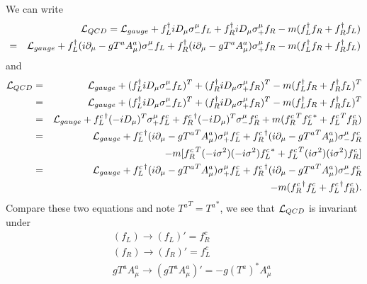 \documentclass[11pt]{article}
\def\del{{\partial}}
\begin{document}
\section{ }
We can write 
\begin{eqnarray}
    &&{\cal L}_{QCD}
    = {\cal L}_{gauge} + f_L^\dagger iD_\mu \sigma_-^\mu f_L
                + f_R^\dagger iD_\mu \sigma_+^\mu f_R
                - m ( f_L^\dagger f_R + f_R^\dagger f_L ) \nonumber \\
    &=& {\cal L}_{gauge} + f_L^\dagger (i\del_\mu-g T^a A_\mu^a) \sigma_-^\mu f_L + f_R^\dagger (i\del_\mu-g T^a A_\mu^a) \sigma_+^\mu f_R
    - m ( f_L^\dagger f_R + f_R^\dagger f_L )
\end{eqnarray}
and
\begin{eqnarray}
    {\cal L}_{QCD}
    &=& {\cal L}_{gauge} + ( f_L^\dagger iD_\mu \sigma_-^\mu f_L )^T
    + ( f_R^\dagger iD_\mu \sigma_+^\mu f_R )^T
    - m ( f_L^\dagger f_R + f_R^\dagger f_L )^T \nonumber \\
    &=& {\cal L}_{gauge} + ( f_L^\dagger iD_\mu \sigma_-^\mu f_L )^T
                + ( f_R^\dagger iD_\mu \sigma_+^\mu f_R )^T
                - m ( f_L^\dagger f_R + f_R^\dagger f_L )^T \nonumber \\
    &=& {\cal L}_{gauge} + {f_L^c}^\dagger (-iD_\mu)^T \sigma_+^\mu f_L^c
                + {f_R^c}^\dagger (-iD_\mu)^T \sigma_-^\mu f_R^c
                + m ( {f_R^c}^T {f_L^c}^*  + {f_L^c}^T {f_R^c} ) \nonumber \\
    &=& {\cal L}_{gauge} + {f_L^c}^\dagger (i\del_\mu-g {T^a}^T A_\mu^a) \sigma_+^\mu f_L^c
    + {f_R^c}^\dagger (i\del_\mu-g {T^a}^T A_\mu^a) \sigma_-^\mu f_R^c \nonumber \\
    &&- m [ {f_R^c}^T (-i\sigma^2) (-i\sigma^2) {f_L^c}^*  + {f_L^c}^T (i\sigma^2) (i\sigma^2) {f_R^c} ] \nonumber \\
    &=& {\cal L}_{gauge} + {f_L^c}^\dagger (i\del_\mu-g {T^a}^T A_\mu^a) \sigma_+^\mu f_L^c
    + {f_R^c}^\dagger (i\del_\mu-g {T^a}^T A_\mu^a) \sigma_-^\mu f_R^c  \nonumber \\ &&-m({f_R^c}^\dagger f_L^c+{f_L^c}^\dagger f_R^c).
\end{eqnarray}
Compare these two equations and note ${T^a}^T={T^a}^*$, we see that ${\cal L}_{QCD}$ is invariant under
\begin{eqnarray}
    && (f_L) \to (f_L)' = f_R^c  \\
    && (f_R) \to (f_R)' = f_L^c  \\
    && g T^a A^a_\mu \to (g T^a A^a_\mu)' = -g (T^a)^* A^a_\mu 
\end{eqnarray}
\end{document}
